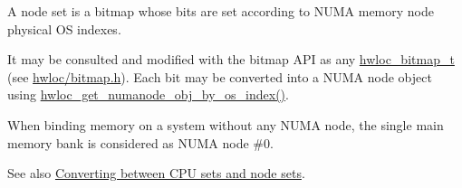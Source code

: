A node set is a bitmap whose bits are set according to N\+U\+MA memory node physical OS indexes. 

It may be consulted and modified with the bitmap A\+PI as any \hyperlink{a00205_gaa3c2bf4c776d603dcebbb61b0c923d84}{hwloc\+\_\+bitmap\+\_\+t} (see \hyperlink{a00125_source}{hwloc/bitmap.\+h}). Each bit may be converted into a N\+U\+MA node object using \hyperlink{a00200_gab89d9ed9edfaa3dd526fb6ee1a1618ea}{hwloc\+\_\+get\+\_\+numanode\+\_\+obj\+\_\+by\+\_\+os\+\_\+index()}.

When binding memory on a system without any N\+U\+MA node, the single main memory bank is considered as N\+U\+MA node \#0.

See also \hyperlink{a00203}{Converting between C\+PU sets and node sets}. 